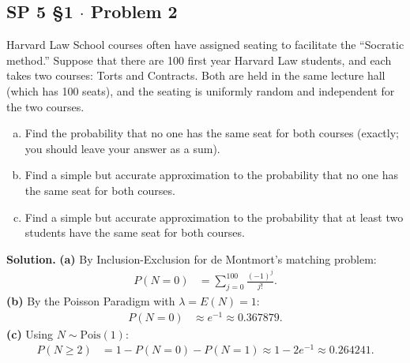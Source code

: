 \documentclass[11pt,a4paper]{article}
\begin{document}
\subsection{SP 5 \S1 $\cdot$ Problem 2}
\begin{tcolorbox}[title={SP 5 \S1 $\cdot$ Problem 2}]
Harvard Law School courses often have assigned seating to facilitate the ``Socratic method.'' Suppose that there are 100 first year Harvard Law students, and each takes two courses: Torts and Contracts. Both are held in the same lecture hall (which has 100 seats), and the seating is uniformly random and independent for the two courses.
\begin{enumerate}[(a)]
\item Find the probability that no one has the same seat for both courses (exactly; you should leave your answer as a sum).
\item Find a simple but accurate approximation to the probability that no one has the same seat for both courses.
\item Find a simple but accurate approximation to the probability that at least two students have the same seat for both courses.
\end{enumerate}
\end{tcolorbox}

\noindent \textbf{Solution.} \textbf{(a)} By Inclusion-Exclusion for de Montmort's matching problem:
\begin{align*}
P(N = 0) &= \sum_{j=0}^{100} \frac{(-1)^j}{j!}.
\end{align*}
\textbf{(b)} By the Poisson Paradigm with $\lambda = E(N) = 1$:
\begin{align*}
P(N = 0) &\approx e^{-1} \approx 0.367879.
\end{align*}
\textbf{(c)} Using $N \sim \text{Pois}(1)$:
\begin{align*}
P(N \ge 2) &= 1 - P(N = 0) - P(N = 1) \approx 1 - 2e^{-1} \approx 0.264241.
\end{align*}

\vspace{10pt}
\end{document}
